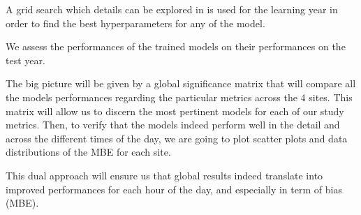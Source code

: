 A grid search which details can be explored in \cite{myrepo} is used for the learning year in order to find the best hyperparameters for any of the model.

We assess the performances of the trained models on their performances on the test year.

The big picture will be given by a global significance matrix that will compare all the models performances regarding the particular metrics across the 4 sites.
This matrix will allow us to discern the most pertinent models for each of our study metrics.
Then, to verify that the models indeed perform well in the detail and across the different times of the day, we are going to plot scatter plots and data distributions of the MBE for each site.

This dual approach will ensure us that global results indeed translate into improved performances for each hour of the day, and especially in term of bias (MBE).